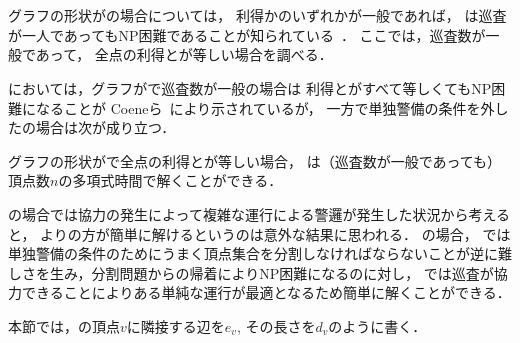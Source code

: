 \section{{\graphStar}}
\label{section: star}

グラフの形状が{\graphStar}の場合については，
利得か{\maxIdletime}のいずれかが一般であれば，
{\patProb}は巡査が一人であってもNP困難であることが知られている~\cite{coene2011charlemagne}．
ここでは，巡査数が一般であって，
全点の利得と{\maxIdletime}が等しい場合を調べる．

{\independentPatProb}においては，グラフが{\graphStar}で巡査数が一般の場合は
利得と{\maxIdletime}がすべて等しくてもNP困難になることが
Coeneら~\cite{coene2011charlemagne}により示されているが，
一方で単独警備の条件を外した{\patProb}の場合は次が成り立つ．

\begin{theo}
\label{theo:StarEqualProfitTimelimit}
グラフの形状が{\graphStar}で全点の利得と{\maxIdletime}が等しい場合，
{\patProb}は（巡査数が一般であっても）
頂点数$n$の多項式時間で解くことができる．
\end{theo}

{\graphLine}の場合では協力の発生によって複雑な運行による警邏が発生した状況から考えると，
{\independentPatProb}より{\patProb}の方が簡単に解けるというのは意外な結果に思われる．
{\graphStar}の場合，
{\independentPatProb}では
単独警備の条件のためにうまく頂点集合を分割しなければならないことが逆に難しさを生み，分割問題からの帰着によりNP困難になるのに対し，
{\patProb}では巡査が協力できることによりある単純な運行が最適となるため簡単に解くことができる．

本節では，{\graphStar}の頂点$v$に隣接する辺を$e_v$, その長さを$d_v$のように書く．

